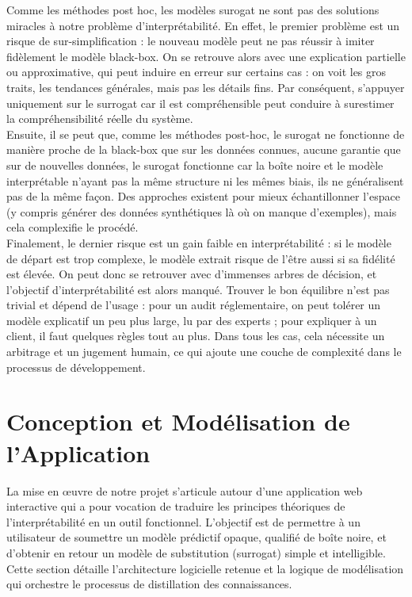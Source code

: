 \documentclass{article}
\begin{document}
    \quad Comme les méthodes post hoc, les modèles surogat ne sont pas des solutions miracles à notre problème d'interprétabilité. En effet, le premier problème est un risque de sur-simplification : le nouveau modèle peut ne pas réussir à imiter fidèlement le modèle black-box. On se retrouve alors avec une explication partielle ou approximative, qui peut induire en erreur sur certains cas : on voit les gros traits, les tendances générales, mais pas les détails fins. Par conséquent, s’appuyer uniquement sur le surrogat car il est compréhensible peut conduire à surestimer la compréhensibilité réelle du système.\\
    
    Ensuite, il se peut que, comme les méthodes post-hoc, le surogat ne fonctionne de manière proche de la black-box que sur les données connues, aucune garantie que sur de nouvelles données, le surogat fonctionne car la boîte noire et le modèle interprétable n’ayant pas la même structure ni les mêmes biais, ils ne généralisent pas de la même façon. Des approches existent pour mieux échantillonner l’espace (y compris générer des données synthétiques là où on manque d’exemples), mais cela complexifie le procédé.\\
    
    Finalement, le dernier risque est un gain faible en interprétabilité : si le modèle de départ est trop complexe, le modèle extrait risque de l’être aussi si sa fidélité est élevée. On peut donc se retrouver avec d’immenses arbres de décision, et l’objectif d’interprétabilité est alors manqué. Trouver le bon équilibre n’est pas trivial et dépend de l’usage : pour un audit réglementaire, on peut tolérer un modèle explicatif un peu plus large, lu par des experts ; pour expliquer à un client, il faut quelques règles tout au plus. Dans tous les cas, cela nécessite un arbitrage et un jugement humain, ce qui ajoute une couche de complexité dans le processus de développement.

\clearpage

\section{Conception et Modélisation de l'Application}

\quad La mise en œuvre de notre projet s'articule autour d'une application web interactive qui a pour vocation de traduire les principes théoriques de l'interprétabilité en un outil fonctionnel. L'objectif est de permettre à un utilisateur de soumettre un modèle prédictif opaque, qualifié de boîte noire, et d'obtenir en retour un modèle de substitution (surrogat) simple et intelligible. Cette section détaille l'architecture logicielle retenue et la logique de modélisation qui orchestre le processus de distillation des connaissances.
\end{document}
